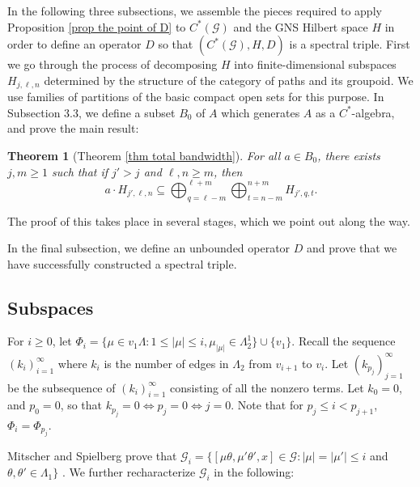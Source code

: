 \documentclass[12pt]{amsart}
\newcommand{\sse}{\subseteq}
\newcommand{\mc}[1]{\mathcal{#1}}
\renewcommand{\th}{\theta}
\newcommand{\La}{\Lambda}
\theoremstyle{plain} %
\newtheorem*{Theorem*}{Theorem}
\theoremstyle{definition} %
\begin{document}
In the following three subsections, we assemble the pieces required to apply Proposition \ref{prop the point of D} to $C^*(\mc{G})$ and the GNS Hilbert space $H$ in order to define an operator $D$ so that $(C^*(\mc{G}), H, D)$ is a spectral triple. 
First we go through the process of decomposing $H$ into finite-dimensional subspaces $H_{j,\ell,n}$ determined by the structure of the category of paths and its groupoid. We use families of partitions of the basic compact open sets for this purpose.
In Subsection 3.3, we define a subset $B_0$ of $A$ which generates $A$ as a $C^*$-algebra, and prove the main result:
\begin{Theorem*}[Theorem \ref{thm total bandwidth}]
    For all $a \in B_0$, there exists $j, m \ge 1$ such that if $j' > j$ and $\ell, n \ge m$, then \begin{equation*}
        a \cdot H_{j', \ell, n} \sse \bigoplus_{q=\ell-m}^{\ell+m} \bigoplus_{t = n-m}^{n+m} H_{j', q, t}.
    \end{equation*}
\end{Theorem*}
The proof of this takes place in several stages, which we point out along the way. %

In the final subsection, we define an unbounded operator $D$ and prove that we have successfully constructed a spectral triple.







\subsection{Subspaces} 
For $i \geq 0$, let $\Phi_i = \{\mu \in v_1 \Lambda : 1 \le |\mu| \leq i, \mu_{|\mu|} \in \Lambda_2^1\} \cup \{v_1\}.$ Recall the sequence $(k_i)_{i=1}^{\infty}$ where $k_i$ is the number of edges in $\Lambda_2$ from $v_{i+1}$ to $v_i$. Let $(k_{p_j})_{j=1}^{\infty}$ be the subsequence of $(k_i)_{i=1}^{\infty}$ consisting of all the nonzero terms. Let $k_0 = 0$, and $p_0 = 0$, so that $k_{p_j} = 0 \Leftrightarrow p_j = 0 \Leftrightarrow j=0$. Note that for $p_j \le i < p_{j+1}$,  $\Phi_i = \Phi_{p_j}$. 

Mitscher and Spielberg prove that $\mc{G}_i = \{[\mu\th, \mu'\th', x] \in \mc{G} : |\mu| = |\mu'| \le i$ and $\th, \th' \in \La_1\}$ \cite[Theorem 3.18]{MS22}. We further recharacterize $\mc{G}_i$ in the following:
\end{document}
